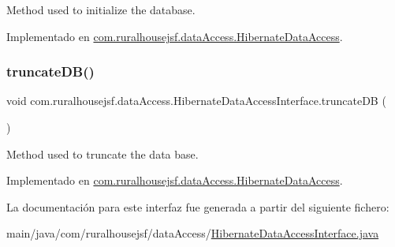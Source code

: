 Method used to initialize the database. 



Implementado en \mbox{\hyperlink{classcom_1_1ruralhousejsf_1_1data_access_1_1_hibernate_data_access_af6f8016d5e185e86519871913781fe73}{com.\+ruralhousejsf.\+data\+Access.\+Hibernate\+Data\+Access}}.

\mbox{\label{interfacecom_1_1ruralhousejsf_1_1data_access_1_1_hibernate_data_access_interface_a181eb91e600e57fe36301128022f535d}} 
\subsubsection{\texorpdfstring{truncateDB()}{truncateDB()}}
{\footnotesize\ttfamily void com.\+ruralhousejsf.\+data\+Access.\+Hibernate\+Data\+Access\+Interface.\+truncate\+DB (\begin{DoxyParamCaption}{ }\end{DoxyParamCaption})}



Method used to truncate the data base. 



Implementado en \mbox{\hyperlink{classcom_1_1ruralhousejsf_1_1data_access_1_1_hibernate_data_access_a81a5e60db58acfc1a3c1de2f014813d5}{com.\+ruralhousejsf.\+data\+Access.\+Hibernate\+Data\+Access}}.



La documentación para este interfaz fue generada a partir del siguiente fichero\+:\begin{DoxyCompactItemize}
\item 
main/java/com/ruralhousejsf/data\+Access/\mbox{\hyperlink{_hibernate_data_access_interface_8java}{Hibernate\+Data\+Access\+Interface.\+java}}\end{DoxyCompactItemize}
